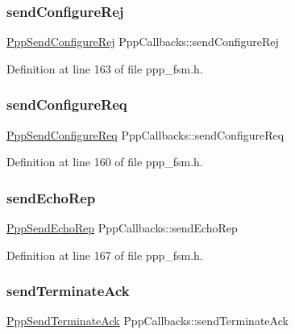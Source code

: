 \subsubsection{\texorpdfstring{send\+Configure\+Rej}{sendConfigureRej}}
{\footnotesize\ttfamily \hyperlink{ppp__fsm_8h_a07e77c278b7ef0ae6032209a2a2e9355}{Ppp\+Send\+Configure\+Rej} Ppp\+Callbacks\+::send\+Configure\+Rej}



Definition at line 163 of file ppp\+\_\+fsm.\+h.

\mbox{\label{structPppCallbacks_a3455ce2a17fe9180f016be4bf7a07a56}} 
\subsubsection{\texorpdfstring{send\+Configure\+Req}{sendConfigureReq}}
{\footnotesize\ttfamily \hyperlink{ppp__fsm_8h_a208d218e9a71164efa83c25973ed31ba}{Ppp\+Send\+Configure\+Req} Ppp\+Callbacks\+::send\+Configure\+Req}



Definition at line 160 of file ppp\+\_\+fsm.\+h.

\mbox{\label{structPppCallbacks_a7b6d16374b35c43b82f7b3da0dbc87da}} 
\subsubsection{\texorpdfstring{send\+Echo\+Rep}{sendEchoRep}}
{\footnotesize\ttfamily \hyperlink{ppp__fsm_8h_a90deee6d649b10694b4c962bd1ec2946}{Ppp\+Send\+Echo\+Rep} Ppp\+Callbacks\+::send\+Echo\+Rep}



Definition at line 167 of file ppp\+\_\+fsm.\+h.

\mbox{\label{structPppCallbacks_a939301e4eed7462430bba254a6bf820b}} 
\subsubsection{\texorpdfstring{send\+Terminate\+Ack}{sendTerminateAck}}
{\footnotesize\ttfamily \hyperlink{ppp__fsm_8h_a63a08a28d6915a0b14a6262ed45da948}{Ppp\+Send\+Terminate\+Ack} Ppp\+Callbacks\+::send\+Terminate\+Ack}



